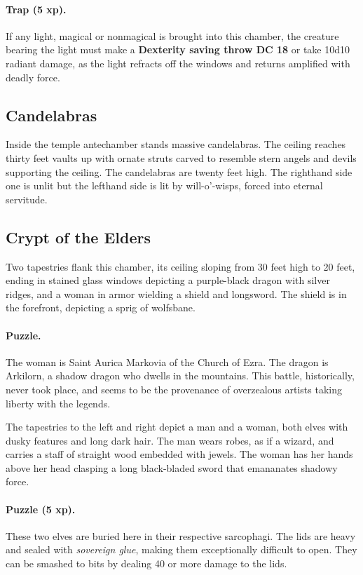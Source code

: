 \paragraph{Trap (5 xp).} If any light, magical or nonmagical is brought into this chamber, the creature bearing the light must make a \textbf{Dexterity saving throw DC 18} or take 10d10 radiant damage, as the light refracts off the windows and returns amplified with deadly force.

\subsection{Candelabras}
Inside the temple antechamber stands massive candelabras. The ceiling reaches thirty feet
vaults up with ornate struts carved to resemble stern angels and devils supporting the ceiling. The candelabras are twenty feet high. The righthand side one is unlit but the lefthand side is lit by will-o'-wisps, forced into eternal servitude.

\subsection{Crypt of the Elders}
Two tapestries flank this chamber, its ceiling sloping from 30 feet high to 20 feet, ending in stained glass windows depicting a purple-black dragon with silver ridges, and a woman in armor wielding a shield and longsword. The shield is in the forefront, depicting a sprig of wolfsbane.

\paragraph{Puzzle.}
The woman is Saint Aurica Markovia of the Church of Ezra. The dragon is Arkilorn, a shadow dragon who dwells in the mountains. This battle, historically, never took place, and seems to be the provenance of overzealous artists taking liberty with the legends.

The tapestries to the left and right depict a man and a woman, both elves with dusky features and long dark hair. The man wears robes, as if a wizard, and carries a staff of straight wood embedded with jewels. The woman has her hands above her head clasping a long black-bladed sword that emananates shadowy force.

\paragraph{Puzzle (5 xp).}
These two elves are buried here in their respective sarcophagi. The lids are heavy and sealed with \textit{sovereign glue}, making them exceptionally difficult to open. They can be smashed to bits by dealing 40 or more damage to the lids.

